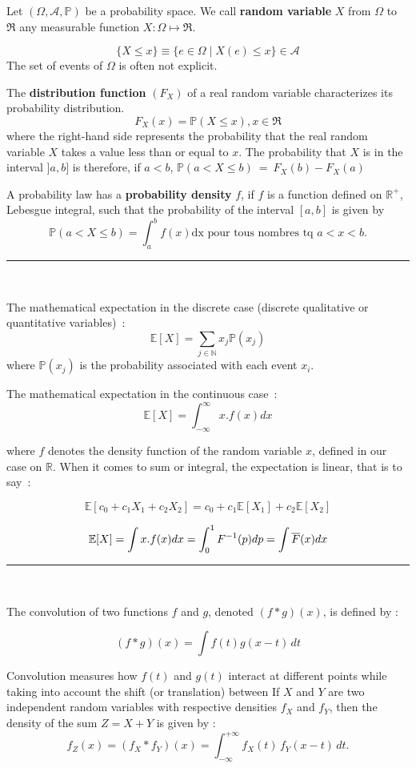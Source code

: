 \begin{f}
	
	Let $ (\Omega, \mathcal{A}, \mathbb{P})$ be a probability space. We call \textbf{random variable} $X$ from $\Omega$ to $ \Re$ any measurable function $X:\Omega\mapsto \Re$.
	
	$$\lbrace X\leq x \rbrace\equiv \lbrace e\in \Omega \mid X(e)\leq x \rbrace \in   \mathcal{A}$$
	The set of events of $\Omega$ is often not explicit.
	
	The \textbf{distribution function} $(F_X)$ of a real random variable characterizes its probability distribution.
	$$
	F_X(x)=\mathbb {P}(X\leq x), x\in \Re
	$$
	where the right-hand side represents the probability that the real random variable $X$ takes a value less than or equal to $x$.
	The probability that $X$ is in the interval $]a, b]$ is therefore, if $a< b$,
	$
	\mathbb{P}(a< X\leq b)\ =\ F_X(b)-F_X(a)
	$
	
	A probability law has a \textbf{probability density} $f$, if $f$ is a function defined on $\mathbb{R}^{+}$, Lebesgue integral, such that the probability of the interval $[a, b]$ is given by
	$$
	\mathbb{P}(a< X\leq b)=\int_a^b f(x) \mathrm{dx} \mbox{ pour tous nombres tq }a<x<b.
	$$
\end{f}
\hrule
\begin{f}[Expectations]{\ }
	
	The mathematical expectation in the discrete case (discrete qualitative or quantitative variables)~:
	$$
	\mathbb{E}[X]=\sum_{j\in \mathbb{N}}x_j\mathbb{P}(x_j)
	$$
	where $\mathbb{P}(x_j)$ is the probability associated with each event $x_i$.
	
	The mathematical expectation in the continuous case~:
	$$
	\mathbb{E}[X]=\int_{-\infty}^{\infty} x. f(x)dx
	$$
	
	where $f$ denotes the density function of the random variable $x$, defined in our case on $\mathbb{R}$.
	When it comes to sum or integral, the expectation is linear, that is to say~:
	
	$$\mathbb{E}[c_0+c_1X_1+c_2X_2]=c_0+c_1\mathbb{E}[X_1]+c_2\mathbb{E}[X_2]$$
	
	$$
	\mathbb{E}[X]=\int x.f(x)dx =\int_0^1 F^{-1}(p)dp= \int \overline{F}(x)dx\\
	$$ 
\end{f}
\hrule
\begin{f}{\ }
	
	The convolution of two functions \( f \) and \( g \), denoted \( (f * g)(x) \), is defined by :
	
	\[
	(f * g)(x) = \int f(t) g(x - t) \, dt
	\]
	
	Convolution measures how \( f(t) \) and \( g(t) \) interact at different points while taking into account the shift (or translation) between
	If \(X\) and \(Y\) are two independent random variables with respective densities \(f_X\) and \(f_Y\), then the density of the sum \(Z = X + Y\) is given by :
	\[
	f_Z(x) = (f_X * f_Y)(x) = \int_{-\infty}^{+\infty} f_X(t)\, f_Y(x - t)\, dt.
	\]
	
\end{f}

